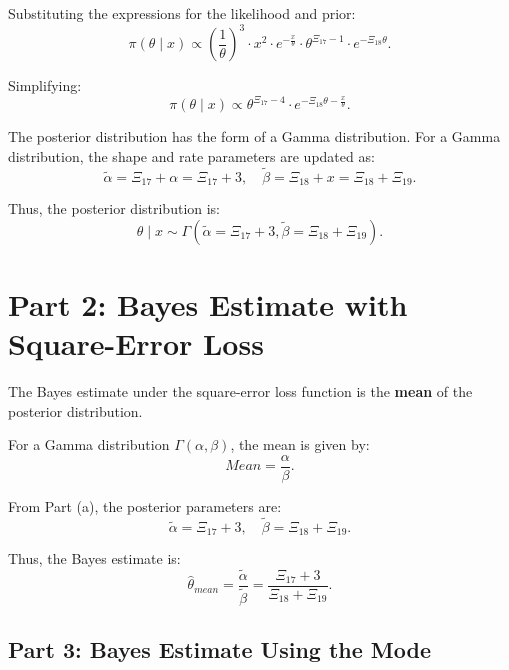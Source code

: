 Substituting the expressions for the likelihood and prior:
\begin{equation}
\pi(\theta \mid x) \propto \left(\frac{1}{\theta}\right)^3 \cdot x^2 \cdot e^{-\frac{x}{\theta}} \cdot \theta^{\Xi_{17}-1} \cdot e^{-\Xi_{18} \theta}.
\end{equation}

Simplifying:
\begin{equation}
\pi(\theta \mid x) \propto \theta^{\Xi_{17} - 4} \cdot e^{-\Xi_{18} \theta - \frac{x}{\theta}}.
\end{equation}

The posterior distribution has the form of a Gamma distribution. For a Gamma distribution, the shape and rate parameters are updated as:
\begin{equation}
\tilde{\alpha} = \Xi_{17} + \alpha = \Xi_{17} + 3, \quad
\tilde{\beta} = \Xi_{18} + x = \Xi_{18} + \Xi_{19}.
\end{equation}

Thus, the posterior distribution is:
\begin{equation}
\theta \mid x \sim \Gamma(\tilde{\alpha} = \Xi_{17} + 3, \tilde{\beta} = \Xi_{18} + \Xi_{19}).
\end{equation}

\section*{Part 2: Bayes Estimate with Square-Error Loss}

The Bayes estimate under the square-error loss function is the \textbf{mean} of the posterior distribution. 

For a Gamma distribution $ \Gamma(\alpha, \beta) $, the mean is given by:
\begin{equation}
Mean = \frac{\alpha}{\beta}.
\end{equation}

From Part (a), the posterior parameters are:
\begin{equation}
\tilde{\alpha} = \Xi_{17} + 3, \quad \tilde{\beta} = \Xi_{18} + \Xi_{19}.
\end{equation}

Thus, the Bayes estimate is:
\begin{equation}
\hat{\theta}_{mean} = \frac{\tilde{\alpha}}{\tilde{\beta}} = \frac{\Xi_{17} + 3}{\Xi_{18} + \Xi_{19}}.
\end{equation}

\subsection{Part 3: Bayes Estimate Using the Mode}

